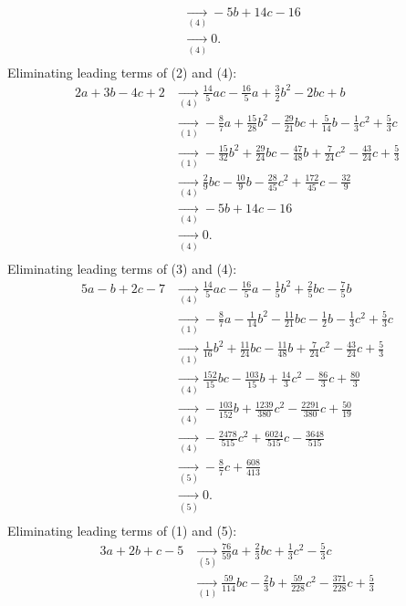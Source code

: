 {\begin{align*}
\\ &\underset{(4)}{\rightarrow}-5b+14c-16
\\ &\underset{(4)}{\rightarrow}0
.\\ \end{align*}
Eliminating leading terms of (2) and (4):
\begin{align*}
2a+3b-4c+2&\underset{(4)}{\rightarrow}\frac{14}{5}ac-\frac{16}{5}a+\frac{3}{2}b^{2}-2bc+b
\\ &\underset{(1)}{\rightarrow}-\frac{8}{7}a+\frac{15}{28}b^{2}-\frac{29}{21}bc+\frac{5}{14}b-\frac{1}{3}c^{2}+\frac{5}{3}c
\\ &\underset{(1)}{\rightarrow}-\frac{15}{32}b^{2}+\frac{29}{24}bc-\frac{47}{48}b+\frac{7}{24}c^{2}-\frac{43}{24}c+\frac{5}{3}
\\ &\underset{(4)}{\rightarrow}\frac{2}{9}bc-\frac{10}{9}b-\frac{28}{45}c^{2}+\frac{172}{45}c-\frac{32}{9}
\\ &\underset{(4)}{\rightarrow}-5b+14c-16
\\ &\underset{(4)}{\rightarrow}0
.\\ \end{align*}
Eliminating leading terms of (3) and (4):
\begin{align*}
5a-b+2c-7&\underset{(4)}{\rightarrow}\frac{14}{5}ac-\frac{16}{5}a-\frac{1}{5}b^{2}+\frac{2}{5}bc-\frac{7}{5}b
\\ &\underset{(1)}{\rightarrow}-\frac{8}{7}a-\frac{1}{14}b^{2}-\frac{11}{21}bc-\frac{1}{2}b-\frac{1}{3}c^{2}+\frac{5}{3}c
\\ &\underset{(1)}{\rightarrow}\frac{1}{16}b^{2}+\frac{11}{24}bc-\frac{11}{48}b+\frac{7}{24}c^{2}-\frac{43}{24}c+\frac{5}{3}
\\ &\underset{(4)}{\rightarrow}\frac{152}{15}bc-\frac{103}{15}b+\frac{14}{3}c^{2}-\frac{86}{3}c+\frac{80}{3}
\\ &\underset{(4)}{\rightarrow}-\frac{103}{152}b+\frac{1239}{380}c^{2}-\frac{2291}{380}c+\frac{50}{19}
\\ &\underset{(4)}{\rightarrow}-\frac{2478}{515}c^{2}+\frac{6024}{515}c-\frac{3648}{515}
\\ &\underset{(5)}{\rightarrow}-\frac{8}{7}c+\frac{608}{413}
\\ &\underset{(5)}{\rightarrow}0
.\\ \end{align*}
Eliminating leading terms of (1) and (5):
\begin{align*}
3a+2b+c-5&\underset{(5)}{\rightarrow}\frac{76}{59}a+\frac{2}{3}bc+\frac{1}{3}c^{2}-\frac{5}{3}c
\\ &\underset{(1)}{\rightarrow}\frac{59}{114}bc-\frac{2}{3}b+\frac{59}{228}c^{2}-\frac{371}{228}c+\frac{5}{3}

\end{align*}}
